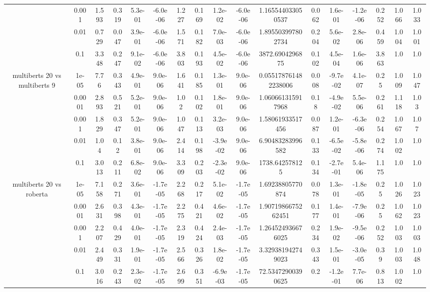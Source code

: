 \begin{tabular}{|c|c|c|c|c|c|c|c|c|c|c|c|c|c|c|c|c|}
 & 0.001 & 1.593 & 0.319 & 5.3e-01 & -6.0e-06 & 1.227 & 0.169 & 1.2e-02 & -6.0e-06 & 1.165544033050537 & 0.062 & 1.6e-01 & -1.2e-06 & 0.252 & 1.066 & 1.033 \\
 & 0.01 & 0.729 & 0.047 & 3.9e-01 & -6.0e-06 & 1.571 & 0.182 & 7.0e-03 & -6.0e-06 & 1.895503997802734 & 0.204 & 5.6e-02 & 2.8e-06 & 0.459 & 1.004 & 1.001 \\
 & 0.1 & 3.348 & 0.247 & 9.1e-02 & -6.0e-06 & 3.803 & 0.193 & 4.5e-02 & -6.0e-06 & 3872.6904296875 & 0.102 & 4.5e-04 & 1.6e-06 & 3.863 & 1.0 & 1.0 \\
\hline
\multirow{5}{*}{multiberts 20 vs multiberts 9} & 1e-05 & 7.76 & 0.343 & 4.9e-01 & 9.0e-06 & 1.641 & 0.185 & 1.3e-01 & 9.0e-06 & 0.055178761482238006 & 0.008 & -9.7e-02 & 4.1e-07 & 0.25 & 1.009 & 1.047 \\
 & 0.0001 & 2.893 & 0.521 & 5.2e-01 & 9.0e-06 & 1.02 & 0.102 & 1.8e-01 & 9.0e-06 & 1.060661315917968 & 0.18 & -4.9e-02 & 5.5e-06 & 0.261 & 1.118 & 1.03 \\
 & 0.001 & 1.829 & 0.347 & 5.2e-01 & 9.0e-06 & 1.047 & 0.113 & 3.2e-03 & 9.0e-06 & 1.58061933517456 & 0.087 & 1.2e-01 & -6.3e-06 & 0.254 & 1.067 & 1.07 \\
 & 0.01 & 1.04 & 0.12 & 3.8e-01 & 9.0e-06 & 2.414 & 0.198 & -3.9e-02 & 9.0e-06 & 6.90483283996582 & 0.133 & -6.5e-02 & -5.8e-06 & 0.274 & 1.002 & 1.0 \\
 & 0.1 & 3.013 & 0.211 & 6.8e-02 & 9.0e-06 & 3.309 & 0.203 & -2.3e-02 & 9.0e-06 & 1738.642578125 & 0.134 & -2.7e-01 & 5.4e-06 & 1.175 & 1.0 & 1.0 \\
\hline
\multirow{5}{*}{multiberts 20 vs roberta } & 1e-05 & 7.158 & 0.271 & 3.6e-01 & -1.7e-05 & 2.268 & 0.217 & 5.1e-02 & -1.7e-05 & 1.69238805770874 & 0.078 & 1.3e-01 & -1.8e-05 & 0.25 & 1.026 & 1.023 \\
 & 0.0001 & 2.631 & 0.398 & 4.3e-01 & -1.7e-05 & 2.275 & 0.421 & 4.6e-02 & -1.7e-05 & 1.9071986675262451 & 0.177 & 1.4e-01 & -7.9e-06 & 0.25 & 1.062 & 1.023 \\
 & 0.001 & 2.207 & 0.429 & 4.0e-01 & -1.7e-05 & 2.319 & 0.424 & 2.4e-03 & -1.7e-05 & 1.264524936676025 & 0.234 & 1.9e-02 & -9.5e-06 & 0.252 & 1.003 & 1.003 \\
 & 0.01 & 2.449 & 0.331 & 1.9e-01 & -1.7e-05 & 2.566 & 0.326 & 1.8e-02 & -1.7e-05 & 3.329381942749023 & 0.343 & 1.5e-01 & -3.0e-05 & 0.39 & 1.003 & 1.048 \\
 & 0.1 & 3.016 & 0.243 & 2.3e-02 & -1.7e-05 & 2.699 & 0.351 & -6.9e-03 & -1.7e-05 & 72.53472900390625 & 0.2 & -1.2e-01 & 7.7e-06 & 0.813 & 1.002 & 1.0 \\

\end{tabular}
